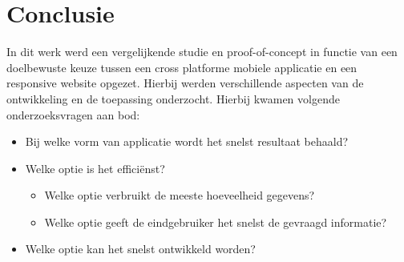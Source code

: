 
\chapter{Conclusie}
\label{ch:conclusie}








In dit werk werd een vergelijkende studie en proof-of-concept in functie van een doelbewuste keuze tussen een
cross platforme mobiele applicatie en een responsive website opgezet. Hierbij werden verschillende aspecten van de ontwikkeling
en de toepassing onderzocht. Hierbij kwamen volgende onderzoeksvragen aan bod:

\begin{itemize}
  \item{Bij welke vorm van applicatie wordt het snelst resultaat behaald?}
  \item{Welke optie is het efficiënst?}
  \begin{itemize}
    \item{Welke optie verbruikt de meeste hoeveelheid gegevens?}
    \item{Welke optie geeft de eindgebruiker het snelst de gevraagd informatie?}
  \end{itemize}
  \item{Welke optie kan het snelst ontwikkeld worden?}
\end{itemize}

